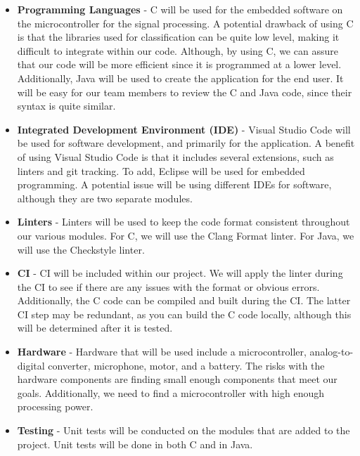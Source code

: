 \documentclass{article}
\begin{document}
\begin{itemize}
	\item \textbf{Programming Languages} - C will be used for the embedded software on the microcontroller for the signal processing. A potential drawback of using C is that the libraries used for classification can be quite low level, making it difficult to integrate within our code. Although, by using C, we can assure that our code will be more efficient since it is programmed at a lower level. Additionally, Java will be used to create the application for the end user. It will be easy for our team members to review the C and Java code, since their syntax is quite similar.
	\item \textbf{Integrated Development Environment (IDE)} - Visual Studio Code will be used for software development, and primarily for the application. A benefit of using Visual Studio Code is that it includes several extensions, such as linters and git tracking. To add, Eclipse will be used for embedded programming. A potential issue will be using different IDEs for software, although they are two separate modules.
	\item \textbf{Linters} - Linters will be used to keep the code format consistent throughout our various modules. For C, we will use the Clang Format linter. For Java, we will use the Checkstyle linter.
	\item \textbf{CI} - CI will be included within our project. We will apply the linter during the CI to see if there are any issues with the format or obvious errors. Additionally, the C code can be compiled and built during the CI. The latter CI step may be redundant, as you can build the C code locally, although this will be determined after it is tested.
	\item \textbf{Hardware} - Hardware that will be used include a microcontroller, analog-to-digital converter, microphone, motor, and a battery. The risks with the hardware components are finding small enough components that meet our goals. Additionally, we need to find a microcontroller with high enough processing power.
	\item \textbf{Testing} - Unit tests will be conducted on the modules that are added to the project. Unit tests will be done in both C and in Java.
\end{itemize}
\end{document}
